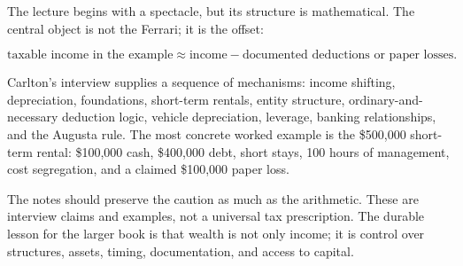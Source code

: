 The lecture begins with a spectacle, but its structure is mathematical. The central object is not the Ferrari; it is the offset:

\begin{equation}
\text{taxable income in the example}
\approx
\text{income}
-
\text{documented deductions or paper losses}.
\end{equation}

Carlton's interview supplies a sequence of mechanisms: income shifting, depreciation, foundations, short-term rentals, entity structure, ordinary-and-necessary deduction logic, vehicle depreciation, leverage, banking relationships, and the Augusta rule. The most concrete worked example is the \$500,000 short-term rental: \$100,000 cash, \$400,000 debt, short stays, 100 hours of management, cost segregation, and a claimed \$100,000 paper loss.

The notes should preserve the caution as much as the arithmetic. These are interview claims and examples, not a universal tax prescription. The durable lesson for the larger book is that wealth is not only income; it is control over structures, assets, timing, documentation, and access to capital.